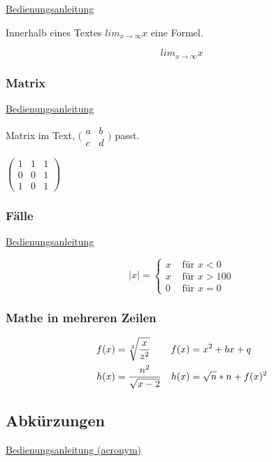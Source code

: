 \documentclass[a4paper, 11pt]{article}
\begin{document}
\href{https://de.overleaf.com/learn/latex/Integrals%2C_sums_and_limits}{Bedienungsanleitung}

Innerhalb eines Textes $lim_{x\to \infty} x$ eine Formel.

\[lim_{x\to \infty} x\]

\subsubsection{Matrix}

\href{https://www.overleaf.com/learn/latex/Matrices}{Bedienungsanleitung}

Matrix im Text,
  $\big(\begin{smallmatrix}
  a & b\\
  c & d
\end{smallmatrix}\big)$
passt.

$\begin{pmatrix}
  1 & 1 & 1\\
  0 & 0 & 1\\
  1 & 0 & 1
\end{pmatrix}$

\subsubsection{Fälle}

\href{https://www.overleaf.com/latex/examples/cases/nndqpbymnchn}{Bedienungsanleitung}

\[
|x|=
\begin{cases}
x & \text{ für } x < 0\\
x & \text{ für } x > 100\\
0 & \text{ für } x = 0
\end{cases}
\]

\subsubsection{Mathe in mehreren Zeilen}

\begin{align}
  f(x)&=\sqrt[3]{\frac{x}{z^2}} &f(x)&=x^2+bx+q\\
  h(x)&=\frac{n^2}{\sqrt{x-2}} &h(x)&=\sqrt{n}\ast n+f(x)^2\notag
\end{align}

\subsection{Abkürzungen}

\href{https://www.namsu.de/Extra/pakete/Acronym.html}{Bedienungsanleitung (acronym)}
\end{document}
